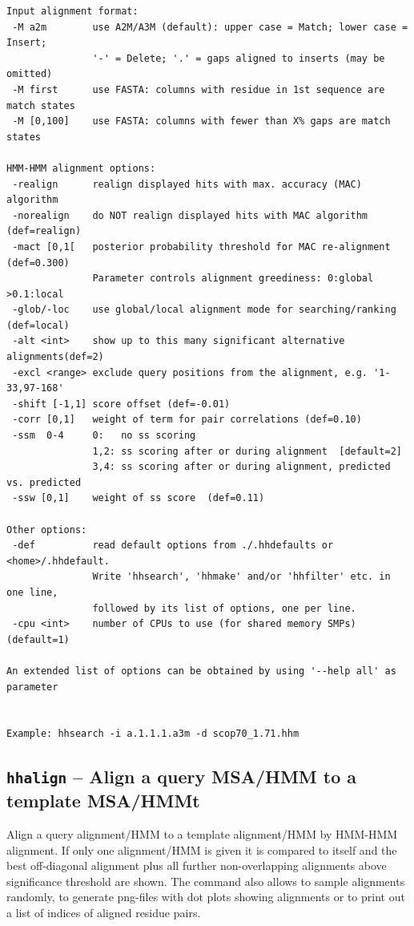 \documentclass[11pt,a4paper]{article}
\begin{document}
\begin{verbatim}
Input alignment format:                                                       
 -M a2m        use A2M/A3M (default): upper case = Match; lower case = Insert;
               '-' = Delete; '.' = gaps aligned to inserts (may be omitted)   
 -M first      use FASTA: columns with residue in 1st sequence are match states
 -M [0,100]    use FASTA: columns with fewer than X% gaps are match states   

HMM-HMM alignment options:                                                    
 -realign      realign displayed hits with max. accuracy (MAC) algorithm 
 -norealign    do NOT realign displayed hits with MAC algorithm (def=realign)
 -mact [0,1[   posterior probability threshold for MAC re-alignment (def=0.300)
               Parameter controls alignment greediness: 0:global >0.1:local
 -glob/-loc    use global/local alignment mode for searching/ranking (def=local)
 -alt <int>    show up to this many significant alternative alignments(def=2)
 -excl <range> exclude query positions from the alignment, e.g. '1-33,97-168' 
 -shift [-1,1] score offset (def=-0.01)                                       
 -corr [0,1]   weight of term for pair correlations (def=0.10)                
 -ssm  0-4     0:   no ss scoring                                             
               1,2: ss scoring after or during alignment  [default=2]       
               3,4: ss scoring after or during alignment, predicted vs. predicted 
 -ssw [0,1]    weight of ss score  (def=0.11)                                

Other options:                                                                
 -def          read default options from ./.hhdefaults or <home>/.hhdefault.  
               Write 'hhsearch', 'hhmake' and/or 'hhfilter' etc. in one line, 
               followed by its list of options, one per line.
 -cpu <int>    number of CPUs to use (for shared memory SMPs) (default=1)

An extended list of options can be obtained by using '--help all' as parameter           


Example: hhsearch -i a.1.1.1.a3m -d scop70_1.71.hhm             
\end{verbatim} \normalsize

\subsection{{\tt hhalign} -- Align a query MSA/HMM to a template MSA/HMMt}

Align a query alignment/HMM to a template alignment/HMM by HMM-HMM alignment.
If only one alignment/HMM is given it is compared to itself and the best
off-diagonal alignment plus all further non-overlapping alignments above 
significance threshold are shown. The command also allows to sample
alignments randomly, to generate png-files with dot plots showing 
alignments or to print out a list of indices of aligned residue pairs. 
\end{document}
